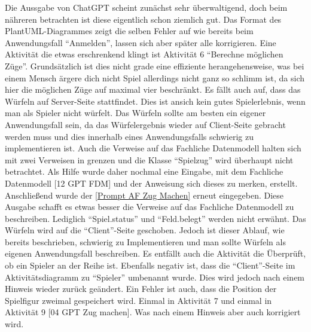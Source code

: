 Die Aussgabe von ChatGPT scheint zunächst sehr überwaltigend, doch beim nähreren betrachten ist diese eigentlich schon ziemlich gut. Das Format des PlantUML-Diagrammes
zeigt die selben Fehler auf wie bereits beim Anwendungsfall ``Anmelden'', lassen sich aber später alle korrigieren. Eine Aktivität die etwas erschrenkend klingt ist Aktivität 6 
``Berechne möglichen Züge''. Grundsätzlich ist dies nicht grade eine effiziente herangehensweise, was bei einem Mensch ärgere dich nicht Spiel allerdings nicht ganz so
schlimm ist, da sich hier die möglichen Züge auf maximal vier beschränkt. Es fällt auch auf, dass das Würfeln auf Server-Seite stattfindet. Dies ist ansich kein gutes 
Spielerlebnis, wenn man als Spieler nicht würfelt. Das 
Würfeln sollte am besten ein eigener Anwendungsfall sein, da das Würfelergebnis wieder auf Client-Seite gebracht werden muss und dies innerhalb eines Anwendungsfalls
schwierig zu implementieren ist. Auch die Verweise auf das Fachliche Datenmodell halten sich mit zwei Verweisen in grenzen und die Klasse ``Spielzug'' wird überhaupt nicht
betrachtet. Als Hilfe wurde daher nochmal eine Eingabe, mit dem Fachliche Datenmodell [12 GPT FDM] und der Anweisung sich dieses zu merken, erstellt. Anschließend wurde 
der \autoref{Prompt AF Zug Machen} erneut eingegeben. Diese Ausgabe schafft es etwas besser die Verweise auf das Fachliche Datenmodell zu beschreiben. Lediglich ``Spiel.status''
und ``Feld.belegt'' werden nicht erwähnt. Das Würfeln wird auf die ``Client''-Seite geschoben. Jedoch ist dieser Ablauf, wie bereits beschrieben, 
schwierig zu Implementieren und man sollte Würfeln als eigenen Anwendungsfall beschreiben. Es entfällt auch die Aktivität die Überprüft, ob ein Spieler an der Reihe ist. 
Ebenfalls negativ ist, dass die ``Client''-Seite im Aktivitätsdiagramm zu ``Spieler'' 
umbenannt wurde. Dies wird jedoch nach einem Hinweis wieder zurück geändert. Ein Fehler ist auch, dass die Position der Spielfigur zweimal gespeichert wird. Einmal in Aktivität 7
und einmal in Aktivität 9 [04 GPT Zug machen]. Was nach einem Hinweis aber auch korrigiert wird.\\ %

